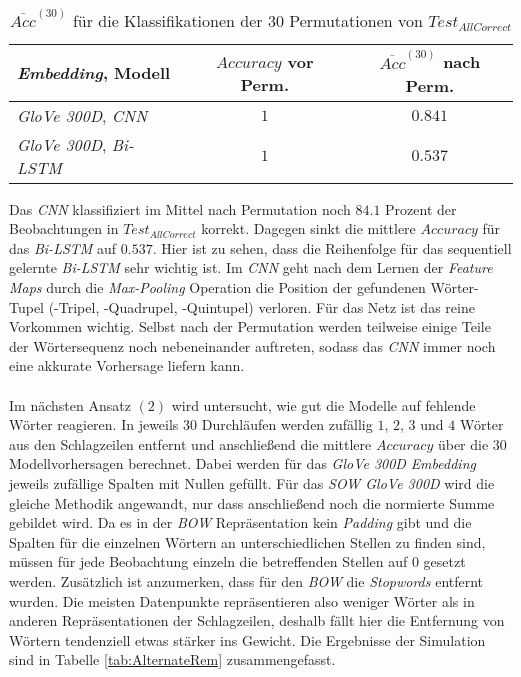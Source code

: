 \documentclass[a4paper,11pt]{article}
\begin{document}
\begin{table}[ht]
\centering
\begin{tabular}{|l|c|c|}
  \hline
  \textit{Embedding}, Modell & $Accuracy$ vor Perm. & $\overline{Acc}^{(30)}$ nach Perm.\\
  \hline
  \textit{GloVe 300D}, \textit{CNN} & $1$ &  $0.841$ \\
  \textit{GloVe 300D}, \textit{Bi-LSTM} & $1$ & $0.537$ \\
  \hline
\end{tabular}
\caption{$\overline{Acc}^{(30)}$ für die Klassifikationen der $30$ Permutationen von $Test_{AllCorrect}$}
\label{tab:AlternatePerm}

\end{table}

Das \textit{CNN} klassifiziert im Mittel nach Permutation noch $84.1$ Prozent der Beobachtungen in $Test_{AllCorrect}$ korrekt. Dagegen sinkt die mittlere $Accuracy$ für das \textit{Bi-LSTM} auf $0.537$. Hier ist zu sehen, dass die Reihenfolge für das sequentiell gelernte \textit{Bi-LSTM} sehr wichtig ist. Im \textit{CNN} geht nach dem Lernen der \textit{Feature Maps} durch die \textit{Max-Pooling} Operation die Position der gefundenen Wörter-Tupel (-Tripel, -Quadrupel, -Quintupel) verloren. Für das Netz ist das reine Vorkommen wichtig. Selbst nach der Permutation werden teilweise einige Teile der Wörtersequenz noch nebeneinander auftreten, sodass das \textit{CNN} immer noch eine akkurate Vorhersage liefern kann.\\
\\
Im nächsten Ansatz $(2)$ wird untersucht, wie gut die Modelle auf fehlende Wörter reagieren. In jeweils $30$ Durchläufen werden zufällig $1$, $2$, $3$ und $4$ Wörter aus den Schlagzeilen entfernt und anschließend die mittlere $Accuracy$ über die $30$ Modellvorhersagen berechnet. Dabei werden für das \textit{GloVe 300D} \textit{Embedding} jeweils zufällige Spalten mit Nullen gefüllt. Für das \textit{SOW GloVe 300D} wird die gleiche Methodik angewandt, nur dass anschließend noch die normierte Summe gebildet wird. Da es in der \textit{BOW} Repräsentation kein \textit{Padding} gibt und die Spalten für die einzelnen Wörtern an unterschiedlichen Stellen zu finden sind, müssen für jede Beobachtung einzeln die betreffenden Stellen auf $0$ gesetzt werden. Zusätzlich ist anzumerken, dass für den \textit{BOW} die \textit{Stopwords} entfernt wurden. Die meisten Datenpunkte repräsentieren also weniger Wörter als in anderen Repräsentationen der Schlagzeilen, deshalb fällt hier die Entfernung von Wörtern tendenziell etwas stärker ins Gewicht. Die Ergebnisse der Simulation sind in Tabelle \ref{tab:AlternateRem} zusammengefasst.
\end{document}
